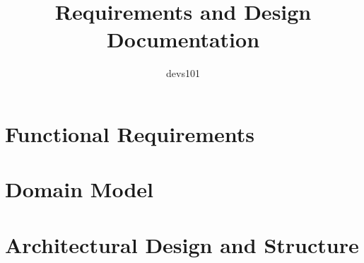 \documentclass{article}
\title{Requirements and Design Documentation}
\author{devs101}
\begin{document}
\tableofcontents
\newpage

\section{Functional Requirements}
\section{Domain Model}
\section{Architectural Design and Structure}
\end{document}
